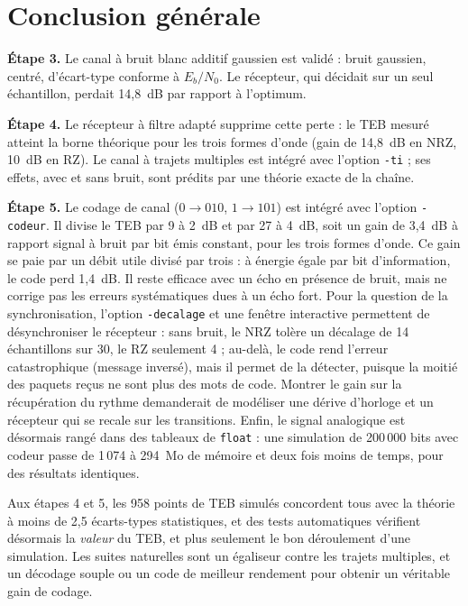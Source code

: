 \documentclass[11pt,a4paper]{article}
\newcommand{\EbNo}{E_b/N_0}
\begin{document}
\section{Conclusion générale}
\textbf{Étape 3.} Le canal à bruit blanc additif gaussien est validé : bruit gaussien, centré, d'écart-type conforme à $\EbNo$. Le récepteur, qui décidait sur un seul échantillon, perdait 14,8~dB par rapport à l'optimum.

\textbf{Étape 4.} Le récepteur à filtre adapté supprime cette perte : le TEB mesuré atteint la borne théorique pour les trois formes d'onde (gain de 14,8~dB en NRZ, 10~dB en RZ). Le canal à trajets multiples est intégré avec l'option \texttt{-ti} ; ses effets, avec et sans bruit, sont prédits par une théorie exacte de la chaîne.

\textbf{Étape 5.} Le codage de canal ($0 \to 010$, $1 \to 101$) est intégré avec l'option \texttt{-codeur}. Il divise le TEB par 9 à 2~dB et par 27 à 4~dB, soit un gain de 3,4~dB à rapport signal à bruit par bit émis constant, pour les trois formes d'onde. Ce gain se paie par un débit utile divisé par trois : à énergie égale par bit d'information, le code perd 1,4~dB. Il reste efficace avec un écho en présence de bruit, mais ne corrige pas les erreurs systématiques dues à un écho fort. Pour la question de la synchronisation, l'option \texttt{-decalage} et une fenêtre interactive permettent de désynchroniser le récepteur : sans bruit, le NRZ tolère un décalage de 14 échantillons sur 30, le RZ seulement 4 ; au-delà, le code rend l'erreur catastrophique (message inversé), mais il permet de la détecter, puisque la moitié des paquets reçus ne sont plus des mots de code. Montrer le gain sur la récupération du rythme demanderait de modéliser une dérive d'horloge et un récepteur qui se recale sur les transitions. Enfin, le signal analogique est désormais rangé dans des tableaux de \texttt{float} : une simulation de 200\,000 bits avec codeur passe de 1\,074 à 294~Mo de mémoire et deux fois moins de temps, pour des résultats identiques.

Aux étapes 4 et 5, les 958 points de TEB simulés concordent tous avec la théorie à moins de 2,5 écarts-types statistiques, et des tests automatiques vérifient désormais la \emph{valeur} du TEB, et plus seulement le bon déroulement d'une simulation. Les suites naturelles sont un égaliseur contre les trajets multiples, et un décodage souple ou un code de meilleur rendement pour obtenir un véritable gain de codage.
\end{document}
